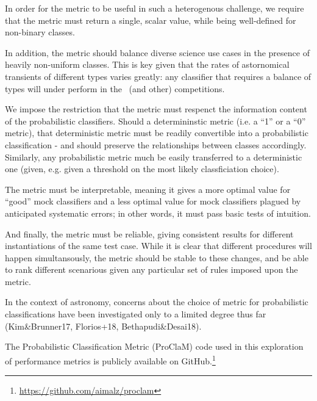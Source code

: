 In order for the metric to be useful in such a heterogenous challenge, we require that the metric must return a single, scalar value, while being well-defined for non-binary classes.

In addition, the metric should balance diverse science use cases in the presence of heavily non-uniform classes.
This is key given that the rates of astornomical transients of different types varies greatly: any classifier that requires a balance of types will under perform in the \plasticc\ (and other) competitions.

We impose the restriction that the metric must respenct the information content of the probabilistic classifiers.
Should a determininstic metric (i.e. a ``1'' or a ``0'' metric), that deterministic metric must be readily convertible into a probabilistic classification - and should preserve the relationships between classes accordingly.
Similarly, any probabilistic metric much be easily transferred to a deterministic one (given, e.g. given a threshold on the most likely classficiation choice).

The metric must be interpretable, meaning it gives a more optimal value for ``good'' mock classifiers and a less optimal value for mock classifiers plagued by anticipated systematic errors; in other words, it must pass basic tests of intuition.

And finally, the metric must be reliable, giving consistent results for different instantiations of the same test case.
While it is clear that different procedures will happen simultansously, the metric should be stable to these changes, and be able to rank different scenarious given any particular set of rules imposed upon the metric.

In the context of astronomy, concerns about the choice of metric for probabilistic classifications have been investigated only to a limited degree thus far (Kim\&Brunner17, Florios+18, Bethapudi\&Desai18).

The Probabilistic Classification Metric (ProClaM) code used in this exploration of performance metrics is publicly available on GitHub.\footnote{\url{https://github.com/aimalz/proclam}}
